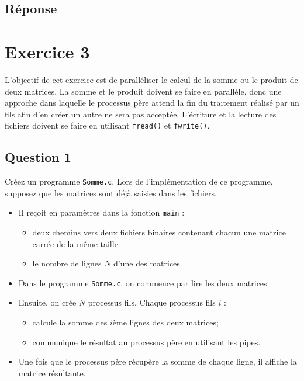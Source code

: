 \documentclass[
	12pt, %
]{fphw}
\begin{document}
\subsection*{Réponse}

\newpage
\section*{Exercice 3}
L'objectif de cet exercice est de paralléliser le calcul de la somme ou le produit de deux matrices.
La somme et le produit doivent se faire en parallèle, donc une approche dans laquelle le processus père attend la fin du traitement réalisé par un fils afin d'en créer un autre ne sera pas acceptée.
L'écriture et la lecture des fichiers doivent se faire en utilisant \texttt{fread()} et \texttt{fwrite()}.
\subsection*{Question 1}
\begin{problem}
Créez un programme \texttt{Somme.c}. Lors de l'implémentation de ce programme, supposez que les matrices sont déjà saisies dans les fichiers.
\begin{itemize}
	\item Il reçoit en paramètres dans la fonction \texttt{main} :
	\begin{itemize}
		\item deux chemins vers deux fichiers binaires contenant chacun une matrice carrée de la même taille 
		\item le nombre de lignes $N$ d'une des matrices. 
	\end{itemize}
	\item Dans le programme \texttt{Somme.c}, on commence par lire les deux matrices. 
	\item Ensuite, on crée $N$ processus fils. Chaque processus fils $i$ :
	\begin{itemize}
		\item calcule la somme des $i$ème lignes des deux matrices;
		\item communique le résultat au processus père en utilisant les pipes. 
	\end{itemize} 
	\item Une fois que le processus père récupère la somme de chaque ligne, il affiche la matrice résultante.
\end{itemize}
\end{problem}
\end{document}
